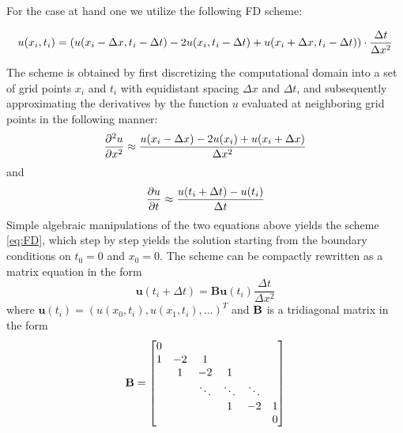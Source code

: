 \documentclass[reprint, english, nofootinbib]{revtex4-2}
\begin{document}
For the case at hand one we utilize the following FD scheme:
\begin{widetext}
\begin{equation}
\label{eq:FD}
    u(x_i,t_i) = \qty(u(x_i - \Delta x,t_i - \Delta t) - 
                 2u(x_i,t_i-\Delta t) + 
                 u(x_i+\Delta x,t_i-\Delta t)) \cdot \frac{\Delta t}{\Delta x^2} 
\end{equation}
\end{widetext}
The scheme is obtained by first discretizing the computational domain into a set of grid points $x_i$ and $t_i$ with equidistant spacing $\Delta x$ and $\Delta t$, and subsequently approximating the derivatives by the function $u$ evaluated at neighboring grid points in the following manner:
\begin{equation}
   \pdv[2]{u}{x} \approx \frac{u(x_i-\Delta x)-2u(x_i) + u(x_i+\Delta x)}{\Delta x^2} 
\end{equation}
and
\begin{equation}
    \pdv{u}{t} \approx \frac{u(t_i + \Delta t) - u(t_{i})}{\Delta t}
\end{equation}
Simple algebraic manipulations of the two equations above yields the scheme \ref{eq:FD}, which step by step yields the solution starting from the boundary conditions on $t_0 = 0$ and $x_0 = 0$. The scheme can be compactly rewritten as a matrix equation in the form
\begin{equation}
    \pmb u(t_i+\Delta t) = \mathbf{B} \pmb u(t_i) \frac{\Delta t}{\Delta x^2}
\end{equation}
where $\pmb u(t_i) = (u(x_0, t_i), u(x_1, t_i), \dots)^T$ and $\bf B$ is a tridiagonal matrix in the form
\begin{equation} \label{eqn: Az = b}
    \mathbf B = \qty[
    \begin{matrix}
    0 \\
    1 & -2 & 1 \\
    & 1 & -2 & 1 \\
    && \ddots & \ddots & \ddots \\
    &&& 1 & -2 & 1 \\
    &&&&& 0
    \end{matrix}
    ]
 \end{equation}
\end{document}

